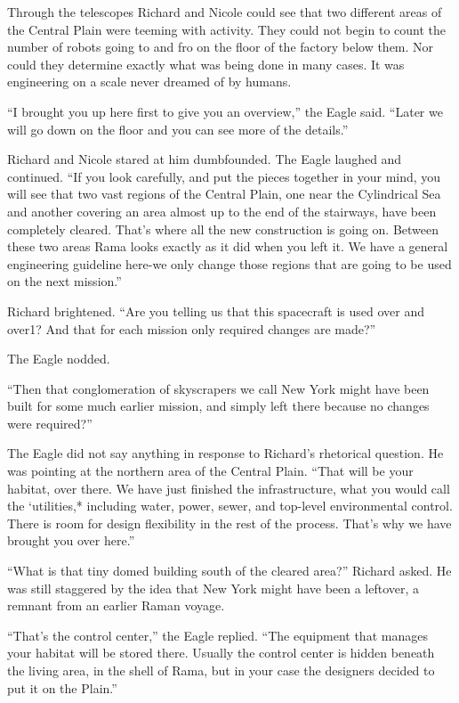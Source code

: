 \documentclass[]{article}
\begin{document}
{Through the telescopes Richard and Nicole could see that two different areas of the Central Plain were teeming with activity.  They could not begin to count the number of robots going to and fro on the floor of the factory below them.  Nor could they determine exactly what was being done in many cases.  It was engineering on a scale never dreamed of by humans.

“I brought you up here first to give you an overview,” the Eagle said.  “Later we will go down on the floor and you can see more of the details.”

Richard and Nicole stared at him dumbfounded.  The Eagle laughed and continued.  “If you look carefully, and put the pieces together in your mind, you will see that two vast regions of the Central Plain, one near the Cylindrical Sea and another covering an area almost up to the end of the stairways, have been completely cleared.  That’s where all the new construction is going on.  Between these two areas Rama looks exactly as it did when you left it.  We have a general engineering guideline here-we only change those regions that are going to be used on the next mission.”

Richard brightened.  “Are you telling us that this spacecraft is used over and over1? And that for each mission only required changes are made?”

The Eagle nodded.

“Then that conglomeration of skyscrapers we call New York might have been built for some much earlier mission, and simply left there because no changes were required?”

The Eagle did not say anything in response to Richard’s rhetorical question.  He was pointing at the northern area of the Central Plain.  “That will be your habitat, over there.  We have just finished the infrastructure, what you would call the ‘utilities,* including water, power, sewer, and top-level environmental control.  There is room for design flexibility in the rest of the process.  That’s why we have brought you over here.”

“What is that tiny domed building south of the cleared area?” Richard asked.  He was still staggered by the idea that New York might have been a leftover, a remnant from an earlier Raman voyage.

“That’s the control center,” the Eagle replied.  “The equipment that manages your habitat will be stored there.  Usually the control center is hidden beneath the living area, in the shell of Rama, but in your case the designers decided to put it on the Plain.”

}
\end{document}
